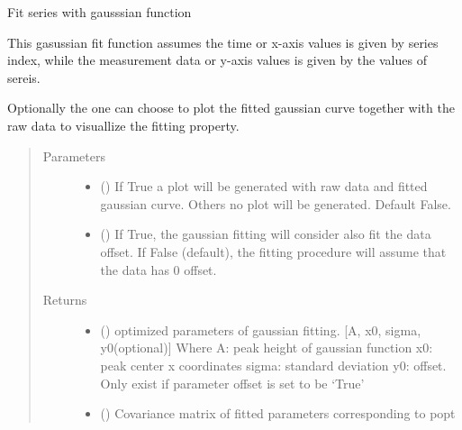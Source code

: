 \documentclass[letterpaper,10pt,english]{sphinxmanual}
\begin{document}
\begin{fulllineitems}
\begin{fulllineitems}
\begin{quote}
\begin{description}
\end{description}\end{quote}

\end{fulllineitems}


\begin{fulllineitems}
\label{\detokenize{scibeam.core:scibeam.core.peak.SeriesPeak.gausFit}}
Fit series with gausssian function

This gasussian fit function assumes the time or x-axis values is given
by series index, while the measurement data or y-axis values is given by
the values of sereis.

Optionally the one can choose to plot the fitted gaussian curve together
with the raw data to visuallize the fitting property.
\begin{quote}\begin{description}
\item[{Parameters}] \leavevmode\begin{itemize}
\item {} 
 () \textendash{} If True a plot will be generated with raw data and fitted gaussian
curve. Others no plot will be generated. Default False.

\item {} 
 () \textendash{} If True, the gaussian fitting will consider also fit the data
offset. If False (default), the fitting procedure will assume that
the data has 0 offset.

\end{itemize}

\item[{Returns}] \leavevmode
\begin{itemize}
\item {} 
 () \textendash{} optimized parameters of gaussian fitting.
{[}A, x0, sigma, y0(optional){]} Where
A: peak height of gaussian function
x0: peak center x coordinates
sigma: standard deviation
y0: offset. Only exist if parameter offset is set to be ‘True’

\item {} 
 () \textendash{} Covariance matrix of fitted parameters corresponding to popt


\end{itemize}
\end{description}
\end{quote}
\end{fulllineitems}
\end{fulllineitems}
\end{document}

